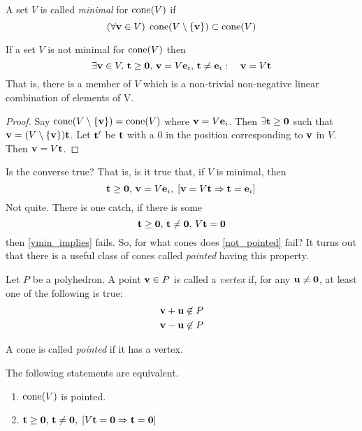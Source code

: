 \begin{Def}
	A set $V$ is called \textit{minimal} for $\operatorname{cone}(V)$ if
	\[ (\forall \mathbf{v} \in V)\; \operatorname{cone}(V\setminus\{\mathbf{v}\}) \subset \operatorname{cone}(V) \]
\end{Def}

\begin{Prop}\label{v_not_minimal}
	If a set $V$ is not minimal for $\operatorname{cone}(V)$ then
	\[\exists \mathbf{v}\in V,\, \mathbf{t}\geq\mathbf{0},\, \mathbf{v}=V\mathbf{e}_i,\,\mathbf{t}\neq\mathbf{e}_i:\quad \mathbf{v} = V\mathbf{t} \]
	That is, there is a member of $V$ which is a non-trivial non-negative linear combination of elements of V.
\end{Prop}

\begin{proof}
	Say $\operatorname{cone}(V\setminus\{\mathbf{v}\}) = \operatorname{cone}(V)$ where $\mathbf{v}=V\mathbf{e}_i$.  Then $\exists \mathbf{t}\geq\mathbf{0}$ such that $\mathbf{v}=(V\setminus\{\mathbf{v}\})\mathbf{t}$.  Let $\mathbf{t}'$ be $\mathbf{t}$ with a $0$ in the position corresponding to $\mathbf{v}$ in $V$.  Then $\mathbf{v}=V\mathbf{t}$.
\end{proof}

Is the converse true?  That is, is it true that, if $V$ is minimal, then
\begin{equation}
	\mathbf{t}\geq\mathbf{0},\,\mathbf{v}=V\mathbf{e}_i,\; [\mathbf{v}=V\mathbf{t} \Rightarrow \mathbf{t}=\mathbf{e}_i]\, \label{vmin_implies}
\end{equation}
Not quite.  There is one catch, if there is some
\begin{equation}
	\mathbf{t}\geq\mathbf{0},\,\mathbf{t}\neq\mathbf{0},\,V\mathbf{t}=\mathbf{0}  \label{not_pointed}
\end{equation}
then \eqref{vmin_implies} fails.  So, for what cones does \eqref{not_pointed} fail?  It turns out that there is a useful class of cones called \textit{pointed} having this property.

\begin{Def}[Vertex]
	Let $P$ be a polyhedron.  A point $\mathbf{v} \in P$ is called a \textit{vertex} if, for any $\mathbf{u} \neq \mathbf{0}$, at least one of the following is true:
	\begin{align*}
		\mathbf{v} + \mathbf{u} \not\in P \\
		\mathbf{v} - \mathbf{u} \not\in P
	\end{align*}
\end{Def}

\begin{Def}
	A cone is called \textit{pointed} if it has a vertex.
\end{Def}

\drawNotPointed

\begin{Prop} \label{v_is_pointed} The following statements are equivalent.
	\begin{enumerate}
		\item $\operatorname{cone}(V)$ is pointed.
		\item $\mathbf{t}\geq\mathbf{0},\,\mathbf{t}\neq\mathbf{0},\; [V\mathbf{t}=\mathbf{0} \Rightarrow \mathbf{t}=\mathbf{0}]$
	\end{enumerate}
\end{Prop}

